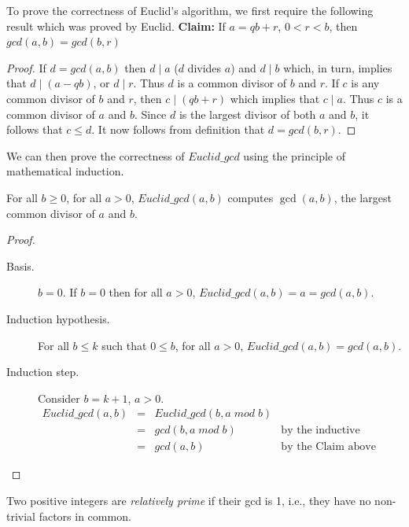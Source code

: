 To prove the correctness of Euclid's algorithm, we first require the following result which was
proved by Euclid. \newline
{\bf Claim:} If $a = qb + r$, $0 < r < b$, then $gcd(a,b) = gcd(b,r)$ \newline
\begin{proof}
If $d = gcd(a,b)$ then $d \mid a$ ($d$ divides $a$) and $d \mid b$ which, in turn, implies that
$d \mid (a - qb)$, or $d \mid r$. Thus $d$ is a common divisor of $b$ and $r$.
If $c$ is any common divisor of $b$ and $r$, then $c \mid (qb + r)$ which implies
that $c \mid a$. Thus $c$ is a common divisor of $a$ and $b$. Since $d$ is the largest
divisor of both $a$ and $b$, it follows that $c \leq d$.
It now follows from definition that $d = gcd(b,r)$.
\end{proof}

We can then prove the correctness of $Euclid\_gcd$ using the principle of mathematical induction.

\begin{theorem}
 For all $b \geq 0$, for all $a > 0$, $Euclid\_gcd(a,b)$ computes $\gcd(a,b)$, the largest common divisor of $a$ and $b$.
 \end{theorem}

\begin{proof}
\begin{description}
\item[Basis.] $b = 0$. If $b = 0$ then for all $a > 0$, 
      $Euclid\_gcd(a,b) = a = gcd(a,b)$.
\item[Induction hypothesis.] For all $b \leq k$ such that $0 \leq b$, for all $a > 0$,
         $Euclid\_gcd(a,b) = gcd(a,b)$.
\item[Induction step.] Consider $b = k+1$,  $a > 0$. 
         \[
         \begin{array}{llll}
         Euclid\_gcd(a,b) & = & Euclid\_gcd(b,a\;mod\;b) \\
                & = & gcd(b,a\;mod\;b) & \mbox{by the inductive hypothesis} \\
                & = & gcd(a,b) & \mbox{by the Claim above}
         \end{array}
         \]
\end{description}
\end{proof}


\begin{definition}
Two positive integers are  \emph{relatively prime} if their gcd is 1, i.e.,  they have no non-trivial factors in common.
\end{definition}

